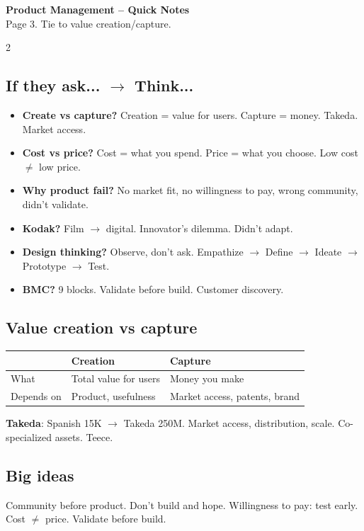 \documentclass[10pt,landscape,a4paper]{article}
\begin{document}
\newpage
\begin{center}
{\LARGE\bfseries\color{accent} Product Management -- Quick Notes}\\[0.3em]
\small Page 3. Tie to value creation/capture.
\end{center}
\vspace{0.5em}
\begin{multicols}{2}
\subsection*{\color{accent} If they ask... $\to$ Think...}
\begin{itemize}[leftmargin=*,nosep]
\item \textbf{Create vs capture?} Creation = value for users. Capture = money. Takeda. Market access.
\item \textbf{Cost vs price?} Cost = what you spend. Price = what you choose. Low cost $\neq$ low price.
\item \textbf{Why product fail?} No market fit, no willingness to pay, wrong community, didn't validate.
\item \textbf{Kodak?} Film $\to$ digital. Innovator's dilemma. Didn't adapt.
\item \textbf{Design thinking?} Observe, don't ask. Empathize $\to$ Define $\to$ Ideate $\to$ Prototype $\to$ Test.
\item \textbf{BMC?} 9 blocks. Validate before build. Customer discovery.
\end{itemize}

\subsection*{\color{accent} Value creation vs capture}
\begin{center}
\small
\begin{tabular}{@{}lll@{}}
\toprule
\textbf{} & \textbf{Creation} & \textbf{Capture} \\
\midrule
What & Total value for users & Money you make \\
Depends on & Product, usefulness & Market access, patents, brand \\
\bottomrule
\end{tabular}
\end{center}
\textbf{Takeda}: Spanish 15K $\to$ Takeda 250M. Market access, distribution, scale. Co-specialized assets. Teece.

\subsection*{\color{accent} Big ideas}
Community before product. Don't build and hope. Willingness to pay: test early. Cost $\neq$ price. Validate before build.


\end{multicols}
\end{document}
